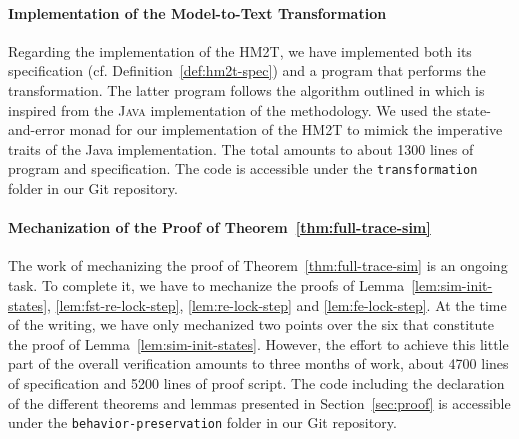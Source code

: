 \documentclass[pdflatex,sn-mathphys]{sn-jnl}%
\theoremstyle{thmstyleone}%
\theoremstyle{thmstyletwo}%
\theoremstyle{thmstylethree}%
\begin{document}
\paragraph{Implementation of the \hilecop{} Model-to-Text Transformation}

% 
%

Regarding the \coq{} implementation of the HM2T, we have implemented
both its specification (cf. Definition~\ref{def:hm2t-spec}) and a
program that performs the transformation. The latter program follows
the algorithm outlined in \cite{Iampietro2021} which is inspired from
the \textsc{Java} implementation of the \hilecop{} methodology. We
used the state-and-error monad for our \coq{} implementation of the
HM2T to mimick the imperative traits of the \textsf{Java}
implementation. The total amounts to about 1300 lines of program and
specification. The code is accessible under the
\texttt{transformation} folder in our \textsf{Git} repository.

\paragraph{Mechanization of the Proof of
  Theorem~\ref{thm:full-trace-sim}}

% 
%

The work of mechanizing the proof of Theorem~\ref{thm:full-trace-sim}
is an ongoing task. To complete it, we have to mechanize the proofs of
Lemma~\ref{lem:sim-init-states}, \ref{lem:fst-re-lock-step},
\ref{lem:re-lock-step} and \ref{lem:fe-lock-step}. At the time of the
writing, we have only mechanized two points over the six that
constitute the proof of Lemma~\ref{lem:sim-init-states}. However, the
effort to achieve this little part of the overall verification amounts
to three months of work, about 4700 lines of specification and 5200
lines of proof script. The code including the declaration of the
different theorems and lemmas presented in Section~\ref{sec:proof} is
accessible under the \texttt{behavior-preservation} folder in our
\textsf{Git} repository.

\bigskip
\end{document}
